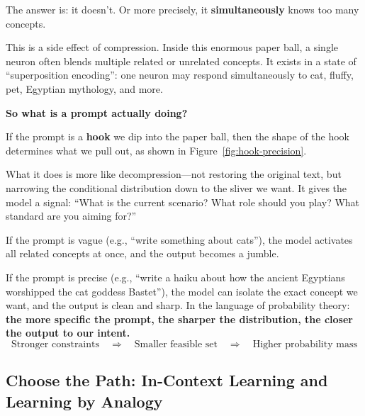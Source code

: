 \vspace{1em}

The answer is: it doesn't. Or more precisely, it \textbf{simultaneously} knows too many concepts.

This is a side effect of compression. Inside this enormous paper ball, a single neuron often blends multiple related or unrelated concepts. It exists in a state of ``superposition encoding'': one neuron may respond simultaneously to cat, fluffy, pet, Egyptian mythology, and more.

\vspace{1em}

\textbf{So what is a prompt actually doing?}

If the prompt is a \textbf{hook} we dip into the paper ball, then the shape of the hook determines what we pull out, as shown in Figure~\ref{fig:hook-precision}.




What it does is more like decompression---not restoring the original text, but narrowing the conditional distribution down to the sliver we want. It gives the model a signal: ``What is the current scenario? What role should you play? What standard are you aiming for?''

\vspace{1em}

If the prompt is vague (e.g., ``write something about cats''), the model activates all related concepts at once, and the output becomes a jumble.

If the prompt is precise (e.g., ``write a haiku about how the ancient Egyptians worshipped the cat goddess Bastet''), the model can isolate the exact concept we want, and the output is clean and sharp. In the language of probability theory: \textbf{the more specific the prompt, the sharper the distribution, the closer the output to our intent.}
\begin{equation*}
\text{Stronger constraints} \quad \Rightarrow \quad \text{Smaller feasible set} \quad \Rightarrow \quad \text{Higher probability mass}
\end{equation*}

\subsection{Choose the Path: In-Context Learning and Learning by Analogy}

